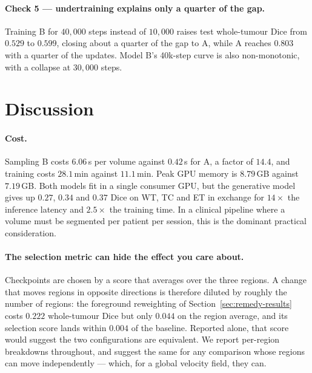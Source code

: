 \documentclass[conference]{IEEEtran}
\begin{document}
\paragraph{Check 5 --- undertraining explains only a quarter of the gap.}
Training B for $40{,}000$ steps instead of $10{,}000$ raises test whole-tumour
Dice from $0.529$ to $0.599$, closing about a quarter of the gap to A, while A
reaches $0.803$ with a quarter of the updates. Model B's 40k-step curve is also
non-monotonic, with a collapse at $30{,}000$ steps.

\REMEDYSECTION





\section{Discussion}
\label{sec:discussion}

\paragraph{Cost.}
Sampling B costs $6.06$\,s per volume against $0.42$\,s for A, a factor of
$14.4$, and training costs $28.1$\,min against $11.1$\,min. Peak GPU memory is
$8.79$\,GB against $7.19$\,GB. Both models fit in a single consumer GPU, but the
generative model gives up $0.27$, $0.34$ and $0.37$ Dice on WT, TC and ET in
exchange for $14\times$ the inference latency and $2.5\times$ the training time.
In a clinical pipeline where a volume must be segmented per
patient per session, this is the dominant practical consideration.

\paragraph{The selection metric can hide the effect you care about.}
Checkpoints are chosen by a score that averages over the three regions. A change
that moves regions in opposite directions is therefore diluted by roughly the
number of regions: the foreground reweighting of Section~\ref{sec:remedy-results}
costs $0.222$ whole-tumour Dice but only $0.044$ on the region average, and its
selection score lands within $0.004$ of the baseline. Reported alone, that score
would suggest the two configurations are equivalent. We report per-region
breakdowns throughout, and suggest the same for any comparison whose regions can
move independently --- which, for a global velocity field, they can.
\end{document}
